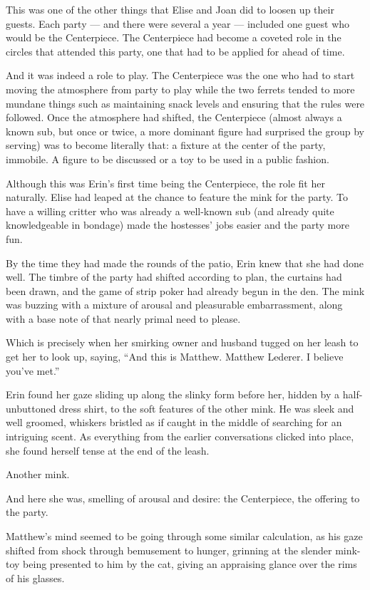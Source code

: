 This was one of the other things that Elise and Joan did to loosen up their guests. Each party --- and there were several a year --- included one guest who would be the Centerpiece. The Centerpiece had become a coveted role in the circles that attended this party, one that had to be applied for ahead of time.

And it was indeed a role to play. The Centerpiece was the one who had to start moving the atmosphere from party to play while the two ferrets tended to more mundane things such as maintaining snack levels and ensuring that the rules were followed. Once the atmosphere had shifted, the Centerpiece (almost always a known sub, but once or twice, a more dominant figure had surprised the group by serving) was to become literally that: a fixture at the center of the party, immobile. A figure to be discussed or a toy to be used in a public fashion.

Although this was Erin's first time being the Centerpiece, the role fit her naturally. Elise had leaped at the chance to feature the mink for the party. To have a willing critter who was already a well-known sub (and already quite knowledgeable in bondage) made the hostesses' jobs easier and the party more fun.

By the time they had made the rounds of the patio, Erin knew that she had done well. The timbre of the party had shifted according to plan, the curtains had been drawn, and the game of strip poker had already begun in the den. The mink was buzzing with a mixture of arousal and pleasurable embarrassment, along with a base note of that nearly primal need to please.

Which is precisely when her smirking owner and husband tugged on her leash to get her to look up, saying, ``And this is Matthew. Matthew Lederer. I believe you've met.''

Erin found her gaze sliding up along the slinky form before her, hidden by a half-unbuttoned dress shirt, to the soft features of the other mink. He was sleek and well groomed, whiskers bristled as if caught in the middle of searching for an intriguing scent. As everything from the earlier conversations clicked into place, she found herself tense at the end of the leash.

Another mink.

And here she was, smelling of arousal and desire: the Centerpiece, the offering to the party.

Matthew's mind seemed to be going through some similar calculation, as his gaze shifted from shock through bemusement to hunger, grinning at the slender mink-toy being presented to him by the cat, giving an appraising glance over the rims of his glasses.

